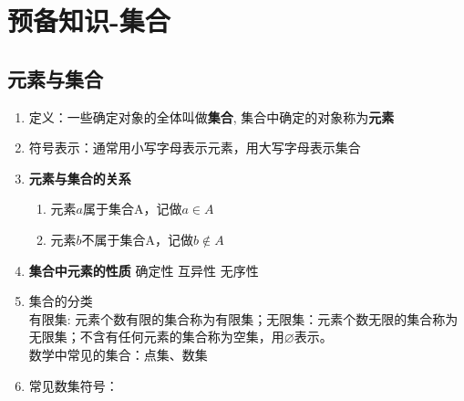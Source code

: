 \chapter*{预备知识-集合}
\section*{元素与集合}
\begin{enumerate}
    \item 定义：一些确定对象的全体叫做\textbf{集合}, 集合中确定的对象称为\textbf{元素}
    \begin{example}
    \end{example}
    \item 符号表示：通常用小写字母表示元素，用大写字母表示集合
    \item \textbf{元素与集合的关系}
            \begin{enumerate}
                \item 元素$a$属于集合A，记做$a \in A$
                \item 元素$b$不属于集合A，记做$b \notin A$
            \end{enumerate}
        \item \textbf{集合中元素的性质}
            确定性 互异性  无序性
        \item 集合的分类 \\
            有限集: 元素个数有限的集合称为有限集；无限集：元素个数无限的集合称为无限集；不含有任何元素的集合称为空集，用$\varnothing$表示。\\
            数学中常见的集合：点集、数集
        \item 常见数集符号：
            \begin{center}
\end{center}
\end{enumerate}
